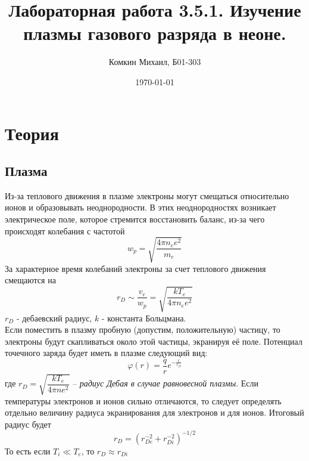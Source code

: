\documentclass[a4paper, 12pt]{article}
\title{Лабораторная работа 3.5.1. Изучение плазмы газового разряда в неоне.}
\author{Комкин Михаил, Б01-303}
\date{\today}
\begin{document}
	\maketitle
	\section*{Теория}
	\subsection*{Плазма}
	
	Из-за теплового движения в плазме электроны могут смещаться относительно ионов и образовывать неоднородности. В этих неоднородностях возникает электрическое поле, которое стремится восстановить баланс, из-за чего происходят колебания с частотой 
	\[w_p = \sqrt{\frac{4\pi n_e e^2}{m_e}}\]
	За характерное время колебаний электроны за счет теплового движения смещаются на 
	\[r_D \sim \frac{v_e}{w_p} = \sqrt{\frac{kT_e}{4\pi n_e e^2}}\]
	$r_D$ - дебаевский радиус, $k$ - константа Больцмана.\\
	Если поместить в плазму пробную (допустим, положительную) частицу, то электроны будут скапливаться около этой частицы, экранируя её поле. Потенциал точечного заряда будет иметь в плазме следующий вид:
	\[\varphi(r) = \frac{q}{r}e^{-\frac{r}{r_D}}\]
	где $r_D = \sqrt{\dfrac{kT_e}{4\pi n e^2}}$ -- \textit{радиус Дебая в случае равновесной плазмы}. Если температуры электронов и ионов сильно отличаются, то следует определять отдельно величину радиуса экранирования для электронов и для ионов. Итоговый радиус будет
	\[r_D = (r_{De}^{-2} + r_{Di}^{-2})^{-1/2}\]
	То есть если $T_i \ll T_e$, то $r_D \approx r_{Di}$ 
\end{document}

